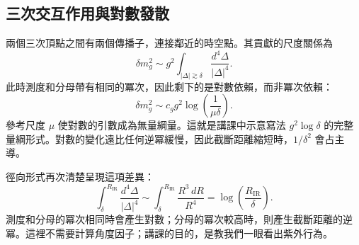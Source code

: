 \subsection{三次交互作用與對數發散}

兩個三次頂點之間有兩個傳播子，連接鄰近的時空點。其貢獻的尺度關係為
\begin{equation}
\delta m_g^2
\sim
g^2\int_{|\Delta|\gtrsim\delta}
\frac{d^4\Delta}{|\Delta|^4}.
\label{eq:cubic-loop}
\end{equation}
此時測度和分母帶有相同的冪次，因此剩下的是對數依賴，而非冪次依賴：
\begin{equation}
\delta m_g^2
\sim
c_g g^2\log\!\left(\frac{1}{\mu\delta}\right).
\label{eq:cubic-log}
\end{equation}
參考尺度 \(\mu\) 使對數的引數成為無量綱量。這就是講課中示意寫法 \(g^2\log\delta\) 的完整量綱形式。對數的變化遠比任何逆冪緩慢，因此截斷距離縮短時，\(1/\delta^2\) 會占主導。

徑向形式再次清楚呈現這項差異：
\begin{equation}
\int_{\delta}^{R_{\mathrm{IR}}}
\frac{d^4\Delta}{|\Delta|^4}
\sim
\int_{\delta}^{R_{\mathrm{IR}}}\frac{R^3\,dR}{R^4}
=\log\!\left(\frac{R_{\mathrm{IR}}}{\delta}\right).
\end{equation}
測度和分母的冪次相同時會產生對數；分母的冪次較高時，則產生截斷距離的逆冪。這裡不需要計算角度因子；講課的目的，是教我們一眼看出紫外行為。

\begin{classroomqa}
\end{classroomqa}

\begin{classroomqa}
\end{classroomqa}

\begin{classroomqa}
\end{classroomqa}


